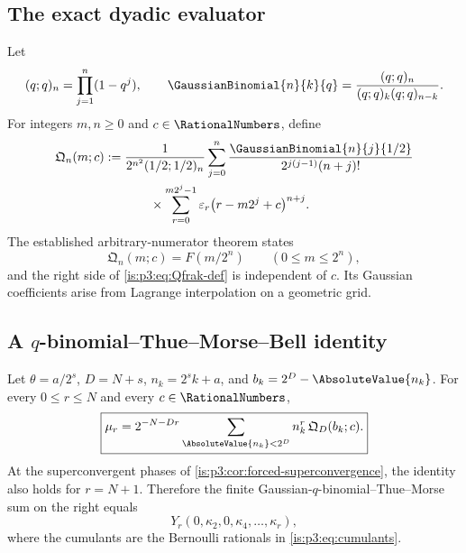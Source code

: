 \subsection{The exact dyadic evaluator}

Let
\begin{equation}
 (q;q)_n=\prod_{j=1}^{n}(1-q^j),
 \qquad
 \GaussianBinomial{n}{k}{q}=\frac{(q;q)_n}{(q;q)_k(q;q)_{n-k}}.
 \label{is:p3:eq:q-notation-report}
\end{equation}
For integers $m,n\ge0$ and $c\in\RationalNumbers$, define
\begin{equation}
\begin{aligned}
 \mathfrak Q_n(m;c)
 :={}&\frac{1}{2^{n^2}(1/2;1/2)_n}
 \sum_{j=0}^{n}
 \frac{\GaussianBinomial{n}{j}{1/2}}
      {2^{j(j-1)}(n+j)!}\\
 &\qquad\times
 \sum_{r=0}^{m2^j-1}\eps_r
 \bigl(r-m2^j+c\bigr)^{n+j}.
 \label{is:p3:eq:Qfrak-def}
\end{aligned}
\end{equation}
The established arbitrary-numerator theorem states
\begin{equation}
 \mathfrak Q_n(m;c)=F(m/2^n)
 \qquad(0\le m\le2^n),
 \label{is:p3:eq:Qfrak-F}
\end{equation}
and the right side of \eqref{is:p3:eq:Qfrak-def} is independent of $c$.  Its Gaussian coefficients arise from Lagrange interpolation on a geometric grid.

\subsection{A \texorpdfstring{$q$}{q}-binomial--Thue--Morse--Bell identity}

\begin{theorem}
\label{is:p3:thm:qbinomial-moment-identity}
Let $\theta=a/2^s$, $D=N+s$, $n_k=2^sk+a$, and $b_k=2^D-\AbsoluteValue{n_k}$.  For every $0\le r\le N$ and every $c\in\RationalNumbers$,
\begin{equation}
 \boxed{\displaystyle
 \mu_r
 =2^{-N-Dr}
 \sum_{\AbsoluteValue{n_k}<2^D}
 n_k^r\,\mathfrak Q_D(b_k;c).}
 \label{is:p3:eq:qbinomial-moment-identity}
\end{equation}
At the superconvergent phases of \cref{is:p3:cor:forced-superconvergence}, the identity also holds for $r=N+1$.  Therefore the finite Gaussian-$q$-binomial--Thue--Morse sum on the right equals
\begin{equation}
 Y_r(0,\kappa_2,0,\kappa_4,\ldots,\kappa_r),
 \label{is:p3:eq:qbinomial-Bell-right}
\end{equation}
where the cumulants are the Bernoulli rationals in \eqref{is:p3:eq:cumulants}.
\end{theorem}


